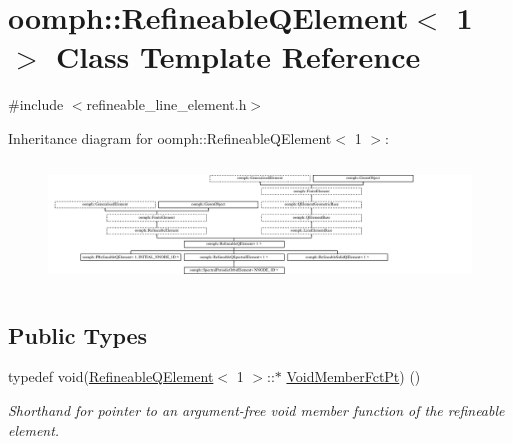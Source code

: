 \hypertarget{classoomph_1_1RefineableQElement_3_011_01_4}{}\section{oomph\+:\+:Refineable\+Q\+Element$<$ 1 $>$ Class Template Reference}
\label{classoomph_1_1RefineableQElement_3_011_01_4}


{\ttfamily \#include $<$refineable\+\_\+line\+\_\+element.\+h$>$}

Inheritance diagram for oomph\+:\+:Refineable\+Q\+Element$<$ 1 $>$\+:\begin{figure}[H]
\begin{center}
\leavevmode
\includegraphics[height=3.284458cm]{classoomph_1_1RefineableQElement_3_011_01_4}
\end{center}
\end{figure}
\subsection*{Public Types}
\begin{DoxyCompactItemize}
\item 
typedef void(\hyperlink{classoomph_1_1RefineableQElement}{Refineable\+Q\+Element}$<$ 1 $>$\+::$\ast$ \hyperlink{classoomph_1_1RefineableQElement_3_011_01_4_a0f87806928148f78469bb23f1a93e1d8}{Void\+Member\+Fct\+Pt}) ()
\begin{DoxyCompactList}\small\item\em Shorthand for pointer to an argument-\/free void member function of the refineable element. \end{DoxyCompactList}\end{DoxyCompactItemize}
